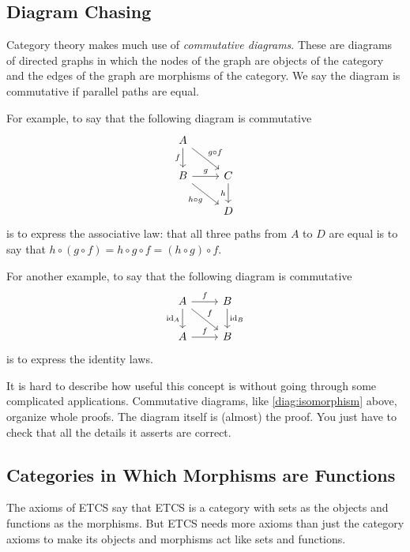 \documentclass[11pt]{article}
\DeclareMathOperator{\idfun}{id}
\begin{document}
\subsection{Diagram Chasing}
\label{sec:diagram}

Category theory makes much use of \emph{commutative diagrams}.
These are diagrams of directed graphs in which the nodes of the graph
are objects of the category and the edges of the graph are morphisms
of the category.  We say the diagram is commutative if parallel paths
are equal.

For example, to say that the following diagram is commutative
\begin{equation}
\label{diag:associative}
\begin{tikzcd}
    A \arrow{d}[swap]{f} \arrow{dr}{g \circ f} \\
    B \arrow{r}{g} \arrow{dr}[swap]{h \circ g} & C \arrow{d}[swap]{h} \\
    & D
\end{tikzcd}
\end{equation}
is to express the associative law: that all three paths from $A$ to $D$
are equal is to say that
$h \circ (g \circ f) = h \circ g \circ f = (h \circ g) \circ f$.

For another example, to say that the following diagram is commutative
\begin{equation}
\label{diag:identity}
\begin{tikzcd}
    A \arrow{r}{f} \arrow{d}[swap]{\idfun_A} \arrow{dr}{f} &
    B \arrow{d}{\idfun_B} \\
    A \arrow{r}{f} & B
\end{tikzcd}
\end{equation}
is to express the identity laws.

It is hard to describe how useful this concept is
without going through some complicated applications.
Commutative diagrams, like \eqref{diag:isomorphism} above,
organize whole proofs.  The diagram itself is (almost) the proof.
You just have to check that all the details it asserts are correct.

\subsection{Categories in Which Morphisms are Functions}

The axioms of ETCS say that ETCS is a category with sets as the objects
and functions as the morphisms.  But ETCS needs more axioms than just
the category axioms to make its
objects and morphisms act like sets and functions.
\end{document}
